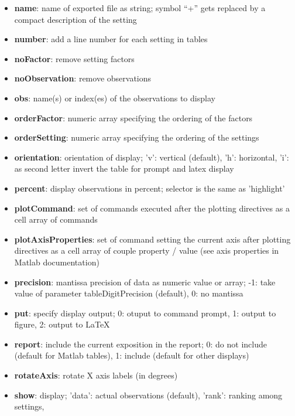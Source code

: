 \documentclass[a4paper,fleqn]{tufte-handout}
\begin{document}
\begin{itemize}
\item \textbf{name}:   name of exported file as string; 
    	symbol ``+'' gets replaced by a compact description of the setting              
\item \textbf{number}:  add a line number for each setting in tables                
\item \textbf{noFactor}:  remove setting factors 
\item \textbf{noObservation}: remove observations                 
\item \textbf{obs}: name(s) or index(es) of the observations to display                 
\item \textbf{orderFactor}:   numeric array specifying the ordering of the factors
\item \textbf{orderSetting}:    numeric array specifying the ordering of the settings              
\item \textbf{orientation}:  orientation of display;
    	'v': vertical (default),
    	'h': horizontal,
       'i': as second letter invert the table for prompt and latex
           display                
\item \textbf{percent}: display observations in percent;
    	selector is the same as 'highlight'  
\item \textbf{plotCommand}:  set of commands executed after the plotting
       directives as a cell array of commands                  
\item \textbf{plotAxisProperties}: set of command setting the current axis after plotting
       directives as a cell array of couple property / value (see axis properties in Matlab documentation)  
\item \textbf{precision}:  mantissa precision of data as numeric value or array;
           -1: take value of  parameter tableDigitPrecision (default),
           0: no mantissa                  
\item \textbf{put}: specify display output;
    	0: otuput to command prompt,
    	1: output to figure,
    	2: output to \LaTeX 
\item \textbf{report}:  include the current exposition in the report;
       0: do not include (default for Matlab tables),  
       1: include (default for other displays)                   
\item \textbf{rotateAxis}: rotate X axis labels (in degrees)   
\item \textbf{show}: display;
        'data': actual observations (default),
        'rank': ranking among settings,

\end{itemize}
\end{document}
